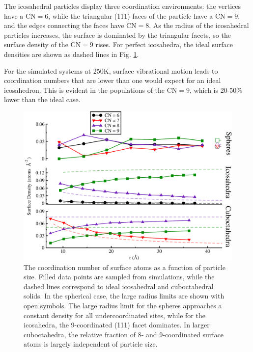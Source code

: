 The icosahedral particles display three coordination environments: the
vertices have a $\text{CN} = 6$, while the triangular (111) faces of
the particle have a $\text{CN} = 9$, and the edges connecting the
faces have $\text{CN} = 8$.  As the radius of the icosahedral
particles increases, the surface is dominated by the triangular
facets, so the surface density of the $\text{CN} = 9$ rises.  For
perfect icosahedra, the ideal surface densities are shown as dashed
lines in Fig. \ref{fig:stacked-cn}.

For the simulated systems at 250K, surface vibrational motion leads to
coordination numbers that are lower than one would expect for an ideal
icosahedron. This is evident in the populations of the $\text{CN}= 9$,
which is 20-50\% lower than the ideal case.

\begin{figure}
	\includegraphics[width=\linewidth]{figures/new-cn.pdf}
	\caption{The coordination number of surface atoms as a
          function of particle size. Filled data points are sampled
          from simulations, while the dashed lines correspond to ideal
          icosahedral and cuboctahedral solids. In the spherical case,
          the large radius limits are shown with open symbols.  The
          large radius limit for the spheres approaches a constant
          density for all undercoordinated sites, while for the
          icosahedra, the 9-coordinated (111) facet dominates. In
          larger cuboctahedra, the relative fraction of 8- and
          9-coordinated surface atoms is largely independent of
          particle size.} 
	\label{fig:stacked-cn}
\end{figure}

